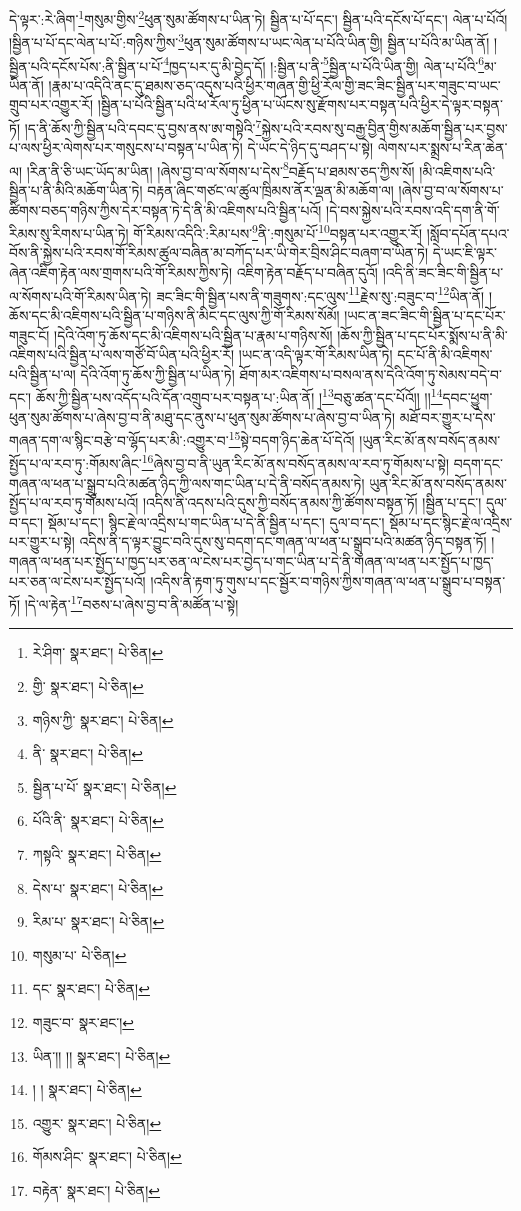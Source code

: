 དེ་ལྟར་:རེ་ཞིག་\footnote{རེ་ཤིག་  སྣར་ཐང་།  པེ་ཅིན། }གསུམ་གྱིས་\footnote{གྱི་  སྣར་ཐང་།  པེ་ཅིན། }ཕུན་སུམ་ཚོགས་པ་ཡིན་ཏེ། སྦྱིན་པ་པོ་དང་། སྦྱིན་པའི་དངོས་པོ་དང་། ལེན་པ་པོའོ། །སྦྱིན་པ་པོ་དང་ལེན་པ་པོ་:གཉིས་ཀྱིས་\footnote{གཉིས་ཀྱི་  སྣར་ཐང་།  པེ་ཅིན། }ཕུན་སུམ་ཚོགས་པ་ཡང་ལེན་པ་པོའི་ཡིན་གྱི། སྦྱིན་པ་པོའི་མ་ཡིན་ནོ། །སྦྱིན་པའི་དངོས་པོས་:ནི་སྦྱིན་པ་པོ་\footnote{ནི་  སྣར་ཐང་།  པེ་ཅིན། }ཁྱད་པར་དུ་མི་བྱེད་དོ། །:སྦྱིན་པ་ནི་\footnote{སྦྱིན་པ་པོ་  སྣར་ཐང་།  པེ་ཅིན། }སྦྱིན་པ་པོའི་ཡིན་གྱི། ལེན་པ་པོའི་\footnote{པོའི་ནི་  སྣར་ཐང་།  པེ་ཅིན། }མ་ཡིན་ནོ། །རྣམ་པ་འདིའི་ནང་དུ་ཐམས་ཅད་འདུས་པའི་ཕྱིར་གཞན་གྱི་ཕྱི་རོལ་གྱི་ཟང་ཟིང་སྦྱིན་པར་གཟུང་བ་ཡང་གྲུབ་པར་འགྱུར་རོ། །སྦྱིན་པ་པོའི་སྦྱིན་པའི་ཕ་རོལ་ཏུ་ཕྱིན་པ་ཡོངས་སུ་རྫོགས་པར་བསྟན་པའི་ཕྱིར་དེ་ལྟར་བསྟན་ཏོ། །ད་ནི་ཆོས་ཀྱི་སྦྱིན་པའི་དབང་དུ་བྱས་ནས་ཨ་གསྟེའི་\footnote{ཀསྟའི་  སྣར་ཐང་།  པེ་ཅིན། }སྐྱེས་པའི་རབས་སུ་བརྒྱ་བྱིན་གྱིས་མཆོག་སྦྱིན་པར་བྱས་པ་ལས་ཕྱིར་ལེགས་པར་གསུངས་པ་བསྟན་པ་ཡིན་ཏེ། དེ་ཡང་དེ་ཉིད་དུ་བཤད་པ་སྟེ། ལེགས་པར་སྨྲས་པ་རིན་ཆེན་ལ། །རིན་ནི་ཅི་ཡང་ཡོད་མ་ཡིན། །ཞེས་བྱ་བ་ལ་སོགས་པ་དེས་\footnote{དེས་པ་  སྣར་ཐང་།  པེ་ཅིན། }བརྗོད་པ་ཐམས་ཅད་ཀྱིས་སོ། །མི་འཇིགས་པའི་སྦྱིན་པ་ནི་མིའི་མཆོག་ཡིན་ཏེ། བརྟན་ཞིང་གཙང་ལ་ཚུལ་ཁྲིམས་ནོར་ལྡན་མི་མཆོག་ལ། །ཞེས་བྱ་བ་ལ་སོགས་པ་ཚིགས་བཅད་གཉིས་ཀྱིས་དེར་བསྟན་ཏེ་དེ་ནི་མི་འཇིགས་པའི་སྦྱིན་པའོ། །དེ་བས་སྐྱེས་པའི་རབས་འདི་དག་ནི་གོ་རིམས་སུ་རིགས་པ་ཡིན་ཏེ། གོ་རིམས་འདིའི་:རིམ་པས་\footnote{རིམ་པ་  སྣར་ཐང་།  པེ་ཅིན། }ནི་:གསུམ་པོ་\footnote{གསུམ་པ་  པེ་ཅིན། }བསྟན་པར་འགྱུར་རོ། །སློབ་དཔོན་དཔའ་བོས་ནི་སྐྱེས་པའི་རབས་གོ་རིམས་ཚུལ་བཞིན་མ་བཀོད་པར་ཡི་གེར་བྲིས་ཤིང་བཞག་བ་ཡིན་ཏེ། དེ་ཡང་ཇི་ལྟར་ཞེན་འཇིག་རྟེན་ལས་གྲགས་པའི་གོ་རིམས་ཀྱིས་ཏེ། འཇིག་རྟེན་བརྗོད་པ་བཞིན་དུའོ། །འདི་ནི་ཟང་ཟིང་གི་སྦྱིན་པ་ལ་སོགས་པའི་གོ་རིམས་ཡིན་ཏེ། ཟང་ཟིང་གི་སྦྱིན་པས་ནི་གཟུགས་:དང་ལུས་\footnote{དང་  སྣར་ཐང་།  པེ་ཅིན། }རྗེས་སུ་:བཟུང་བ་\footnote{གཟུང་བ་  སྣར་ཐང་། }ཡིན་ནོ། །ཆོས་དང་མི་འཇིགས་པའི་སྦྱིན་པ་གཉིས་ནི་མིང་དང་ལུས་ཀྱི་གོ་རིམས་སོམོ། །ཡང་ན་ཟང་ཟིང་གི་སྦྱིན་པ་དང་པོར་གཟུང་ངོ། །དེའི་འོག་ཏུ་ཆོས་དང་མི་འཇིགས་པའི་སྦྱིན་པ་རྣམ་པ་གཉིས་སོ། །ཆོས་ཀྱི་སྦྱིན་པ་དང་པོར་སྨོས་པ་ནི་མི་འཇིགས་པའི་སྦྱིན་པ་ལས་གཙོ་བོ་ཡིན་པའི་ཕྱིར་རོ། །ཡང་ན་འདི་ལྟར་གོ་རིམས་ཡིན་ཏེ། དང་པོ་ནི་མི་འཇིགས་པའི་སྦྱིན་པ་ལ། དེའི་འོག་ཏུ་ཆོས་ཀྱི་སྦྱིན་པ་ཡིན་ཏེ། ཐོག་མར་འཇིགས་པ་བསལ་ནས་དེའི་འོག་ཏུ་སེམས་བདེ་བ་དང་། ཆོས་ཀྱི་སྦྱིན་པས་འདོད་པའི་དོན་འགྲུབ་པར་བསྟན་པ་:ཡིན་ནོ། །\footnote{ཡིན་།། །།  སྣར་ཐང་།  པེ་ཅིན། }བཅུ་ཚན་དང་པོའོ།། །།\footnote{། །  སྣར་ཐང་།  པེ་ཅིན། }དབང་ཕྱུག་ཕུན་སུམ་ཚོགས་པ་ཞེས་བྱ་བ་ནི་མཐུ་དང་ནུས་པ་ཕུན་སུམ་ཚོགས་པ་ཞེས་བྱ་བ་ཡིན་ཏེ། མཐོ་བར་གྱུར་པ་དེས་གཞན་དག་ལ་སྙིང་བརྩེ་བ་ལྷོད་པར་མི་:འགྱུར་བ་\footnote{འགྱུར་  སྣར་ཐང་།  པེ་ཅིན། }སྟེ་བདག་ཉིད་ཆེན་པོ་དེའོ། །ཡུན་རིང་མོ་ནས་བསོད་ནམས་སྤྱོད་པ་ལ་རབ་ཏུ་:གོམས་ཞིང་\footnote{གོམས་ཤིང་  སྣར་ཐང་།  པེ་ཅིན། }ཞེས་བྱ་བ་ནི་ཡུན་རིང་མོ་ནས་བསོད་ནམས་ལ་རབ་ཏུ་གོམས་པ་སྟེ། བདག་དང་གཞན་ལ་ཕན་པ་སྒྲུབ་པའི་མཚན་ཉིད་ཀྱི་ལས་གང་ཡིན་པ་དེ་ནི་བསོད་ནམས་ཏེ། ཡུན་རིང་མོ་ནས་བསོད་ནམས་སྤྱོད་པ་ལ་རབ་ཏུ་གོམས་པའོ། །འདིས་ནི་འདས་པའི་དུས་ཀྱི་བསོད་ནམས་ཀྱི་ཚོགས་བསྟན་ཏོ། །སྦྱིན་པ་དང་། དུལ་བ་དང་། སྡོམ་པ་དང་། སྙིང་རྗེ་ལ་འདྲིས་པ་གང་ཡིན་པ་དེ་ནི་སྦྱིན་པ་དང་། དུལ་བ་དང་། སྡོམ་པ་དང་སྙིང་རྗེ་ལ་འདྲིས་པར་གྱུར་པ་སྟེ། འདིས་ནི་ད་ལྟར་བྱུང་བའི་དུས་སུ་བདག་དང་གཞན་ལ་ཕན་པ་སྒྲུབ་པའི་མཚན་ཉིད་བསྟན་ཏོ། །གཞན་ལ་ཕན་པར་སྤྱོད་པ་ཁྱད་པར་ཅན་ལ་ངེས་པར་བྱེད་པ་གང་ཡིན་པ་དེ་ནི་གཞན་ལ་ཕན་པར་སྤྱོད་པ་ཁྱད་པར་ཅན་ལ་ངེས་པར་སྤྱོད་པའོ། །འདིས་ནི་རྟག་ཏུ་གུས་པ་དང་སྦྱོར་བ་གཉིས་ཀྱིས་གཞན་ལ་ཕན་པ་སྒྲུབ་པ་བསྟན་ཏོ། །དེ་ལ་རྟེན་\footnote{བརྟེན་  སྣར་ཐང་།  པེ་ཅིན། }བཅས་པ་ཞེས་བྱ་བ་ནི་མཚོན་པ་སྟེ། 